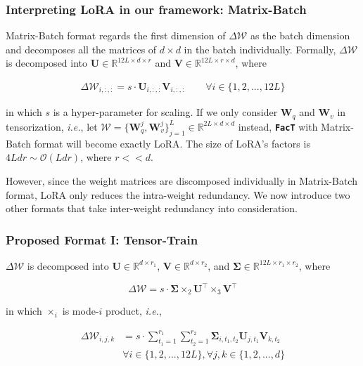 \subsubsection{Interpreting LoRA in our framework: Matrix-Batch} Matrix-Batch format regards the first dimension of $\Delta\boldsymbol{\mathcal{W}}$ as the batch dimension and decomposes all the matrices of $d\times d$ in the batch individually. Formally, $\Delta\boldsymbol{\mathcal{W}}$ is decomposed into $\boldsymbol{U} \in \mathbb{R}^{12L\times d\times r}$ and $\boldsymbol{V} \in \mathbb{R}^{12L\times r\times d}$, where

\begin{equation}
\begin{aligned}
    \Delta\boldsymbol{\mathcal{W}}_{i,:,:}=s\cdot\boldsymbol{U}_{i,:,:}\boldsymbol{V}_{i,:,:}\qquad \forall i\in\{1,2,...,12L\}
\end{aligned}
\end{equation}

in which $s$ is a hyper-parameter for scaling. If we only consider $\boldsymbol{W}_q$ and $\boldsymbol{W}_v$ in tensorization, \emph{i.e.}, let $\boldsymbol{\mathcal{W}}=\big\{\boldsymbol{W}_q^j,\boldsymbol{W}_v^j\big\}_{j=1}^{L}\in \mathbb{R}^{2L\times d\times d}$ instead, \texttt{\textbf{FacT}} with Matrix-Batch format will become exactly LoRA. The size of LoRA's factors is $4Ldr\sim\mathcal{O}(Ldr)$, where $r<<d$.

However, since the weight matrices are discomposed individually in Matrix-Batch format, LoRA only reduces the intra-weight redundancy. We now introduce two other formats that take inter-weight redundancy into consideration.

\subsubsection{Proposed Format I: Tensor-Train}
$\Delta\boldsymbol{\mathcal{W}}$ is decomposed into $\boldsymbol{U} \in \mathbb{R}^{d\times r_1}$, $\boldsymbol{V} \in \mathbb{R}^{d\times r_2}$, and $\mathcal{\boldsymbol{\Sigma}} \in \mathbb{R}^{12L \times r_1\times r_2}$, where

\begin{equation}
\Delta\boldsymbol{\mathcal{W}}=s\cdot\boldsymbol{\Sigma}\times_2\boldsymbol{U}^\intercal\times_3\boldsymbol{V}^\intercal
\end{equation}

in which $\times_i$ is mode-$i$ product, \emph{i.e.},

\begin{equation}
\begin{aligned}
\Delta\boldsymbol{\mathcal{W}}_{i,j,k}&=s\cdot\sum_{t_1=1}^{r_1}\sum_{t_2=1}^{r_2}\boldsymbol{\Sigma}_{i,t_1,t_2}\boldsymbol{U}_{j,t_1}\boldsymbol{V}_{k,t_2}\\& \forall i\in\{1,2,...,12L\}, \forall j,k\in\{1,2,...,d\}
\end{aligned}    
\end{equation}

